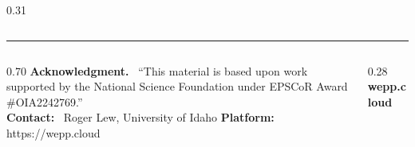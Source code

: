 \documentclass[final]{beamer}
\newlength{\bodyH}\setlength{\bodyH}{69cm}
\newcommand{\goldrule}{\textcolor{uidahogold}{\rule{\linewidth}{7pt}}}
\begin{document}
\begin{frame}[t]
\begin{columns}[t]
\begin{column}{0.31\textwidth}
\begin{minipage}[t][\bodyH][t]{\linewidth}
\end{minipage}
\end{column}

\end{columns}

\vfill
\goldrule
\vspace{12pt}
\begin{columns}[c]
  \begin{column}{0.70\textwidth}
    {\color{icrewsnavy}\bfseries Acknowledgment.}~
    ``This material is based upon work supported by the National Science
    Foundation under EPSCoR Award \#OIA2242769.''\\[8pt]
    {\color{icrewsblue}\bfseries Contact:}~ Roger Lew, University of
    Idaho \qquad
    {\color{icrewsblue}\bfseries Platform:}~ https://wepp.cloud
  \end{column}
  \begin{column}{0.28\textwidth}
    \raggedleft
    {\fontsize{54}{60}\selectfont\bfseries\color{icrewsblue}wepp.cloud}
  \end{column}
\end{columns}
\vspace{4pt}

\end{frame}
\end{document}
